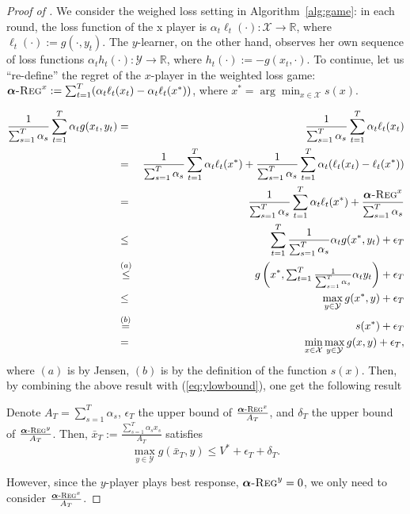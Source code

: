 \documentclass[final,12pt]{colt2018} %
\def\reals{\mathbb{R}}
\def\reals{\mathbb{R}}
\def\balpha{\boldsymbol{\alpha}}
\newcommand{\regret}[1]{\balpha\textsc{-Reg}^{#1}}
\newcommand{\XX}{\mathcal{X}}
\newcommand{\YY}{\mathcal{Y}}
\begin{document}
\begin{proof}[Proof of ]


We consider the weighed loss setting in Algorithm~\ref{alg:game}:
in each round, the
loss function of the x player is $\alpha_t \ell_t(\cdot) : \XX \to \reals$, where $\ell_t(\cdot) := g(\cdot, y_t)$. The $y$-learner, on the other hand, observes her own sequence of loss functions $\alpha_t  h_t(\cdot) : \YY \to \reals$, where $h_t(\cdot) := -  g(x_t, \cdot)$.
To continue, let us
``re-define'' the regret of the $x$-player in the weighted loss game:
$\regret{x}:= \sum_{t=1}^T ( \alpha_t  \ell_t(x_t) - \alpha_t \ell_t(x^*) )$, 
where
$x^* = \arg \min_{x \in \XX} s(x)$.

\begin{eqnarray}
\frac{1}{\sum_{s=1}^T \alpha_s}  \sum_{t=1}^T  \alpha_t g(x_t, y_t) & = & \frac{1}{\sum_{s=1}^T \alpha_s} \sum_{t=1}^T  \alpha_t \ell_t(x_t) \notag \\
  & = &  
\frac{1}{\sum_{s=1}^T \alpha_s} \sum_{t=1}^T  \alpha_t \ell_t(x^*)
+ \frac{1}{\sum_{s=1}^T \alpha_s} \sum_{t=1}^T  \alpha_t ( \ell_t(x_t) - \ell_t(x^*) )
      \notag \\
  & = &  \frac{1}{\sum_{s=1}^T \alpha_s} \sum_{t=1}^T  \alpha_t \ell_t(x^*) + \frac{ \regret{x} }{  \sum_{s=1}^T \alpha_s }  \notag \\
  & \leq &  \sum_{t=1}^T \frac{1}{\sum_{s=1}^T \alpha_s} \alpha_t g(x^*, y_t)  + \epsilon_T \notag \\
  & \overset{(a)}{\leq} & 
    g\left(x^*,{ \textstyle \sum_{t=1}^T \frac{1}{\sum_{s=1}^T \alpha_s} \alpha_t y_t}\right) + \epsilon_T 
    \label{hi2} \\
  & \leq & 
    \max_{y \in \YY} g(x^*,y)  + \epsilon_T    \\ 
  & \overset{(b)}{ = } & 
     s (x^*)  + \epsilon_T    \\ 
  & = & \min_{x \in \XX} \max_{y \in \YY}   g(x,y) + \epsilon_T \notag,
\end{eqnarray}
where $(a)$ is by Jensen, $(b)$ is by the definition of the function $s(x)$.
Then, by combining the above result with (\ref{eq:ylowbound}), one get the following result 
\begin{proposition}
Denote $A_{T}=\sum_{s=1}^T \alpha_s$, $\epsilon_{T}$ the upper bound of 
$\frac{ \regret{x} }{ A_T}$, and $\delta_{T}$ the upper bound of 
$\frac{ \regret{y} }{ A_T}$.  Then,
$\bar{x}_{T} := \frac{ \sum_{s=1}^T \alpha_s x_s  }{ A_T }$ satisfies
$$  \max_{y \in \YY} g( \bar{x}_{T}, y)  \leq  V^* + \epsilon_T + \delta_T.$$
\end{proposition}
However, since the $y$-player plays best response, $\regret{y}=0$, we only need to consider
$\frac{ \regret{x} }{  A_T }$.


\end{proof}
\end{document}
